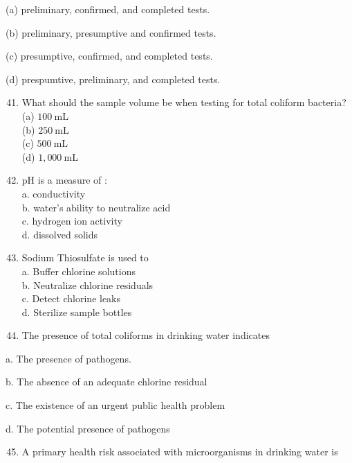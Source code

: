 \documentclass[10pt]{article}
\begin{document}
(a) preliminary, confirmed, and completed tests.

(b) preliminary, presumptive and confirmed tests.

(c) presumptive, confirmed, and completed tests.

(d) prespumtive, preliminary, and completed tests.

\begin{enumerate}
  \setcounter{enumi}{40}
  \item What should the sample volume be when testing for total coliform bacteria?\\
(a) $100 \mathrm{~mL}$\\
(b) $250 \mathrm{~mL}$\\
(c) $500 \mathrm{~mL}$\\
(d) $1,000 \mathrm{~mL}$

  \item $\mathrm{pH}$ is a measure of :\\
a. conductivity\\
b. water's ability to neutralize acid\\
c. hydrogen ion activity\\
d. dissolved solids\\

  \item Sodium Thiosulfate is used to\\
a. Buffer chlorine solutions\\
b. Neutralize chlorine residuals\\
c. Detect chlorine leaks\\
d. Sterilize sample bottles
\end{enumerate}



\begin{enumerate}
  \setcounter{enumi}{43}
  \item The presence of total coliforms in drinking water indicates
\end{enumerate}

a. The presence of pathogens.

b. The absence of an adequate chlorine residual

c. The existence of an urgent public health problem

d. The potential presence of pathogens

\begin{enumerate}
  \setcounter{enumi}{44}
  \item A primary health risk associated with microorganisms in drinking water is
\end{enumerate}
\end{document}
